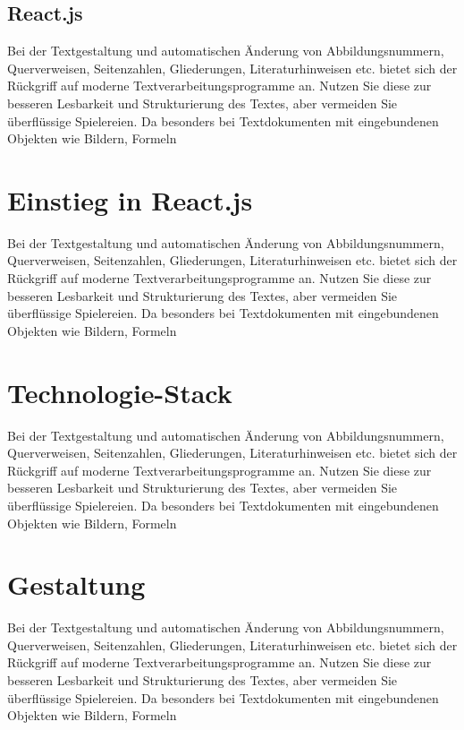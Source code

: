 \subsection{React.js}
Bei der Textgestaltung und automatischen Änderung von Abbildungsnummern, Querverweisen,
Seitenzahlen, Gliederungen, Literaturhinweisen etc. bietet sich der Rückgriff
auf moderne Textverarbeitungsprogramme an. Nutzen Sie diese zur besseren Lesbarkeit
und Strukturierung des Textes, aber vermeiden Sie überflüssige Spielereien. Da
besonders bei Textdokumenten mit eingebundenen Objekten wie Bildern, Formeln

\section{Einstieg in React.js}
Bei der Textgestaltung und automatischen Änderung von Abbildungsnummern, Querverweisen,
Seitenzahlen, Gliederungen, Literaturhinweisen etc. bietet sich der Rückgriff
auf moderne Textverarbeitungsprogramme an. Nutzen Sie diese zur besseren Lesbarkeit
und Strukturierung des Textes, aber vermeiden Sie überflüssige Spielereien. Da
besonders bei Textdokumenten mit eingebundenen Objekten wie Bildern, Formeln

\section{Technologie-Stack}
Bei der Textgestaltung und automatischen Änderung von Abbildungsnummern, Querverweisen,
Seitenzahlen, Gliederungen, Literaturhinweisen etc. bietet sich der Rückgriff
auf moderne Textverarbeitungsprogramme an. Nutzen Sie diese zur besseren Lesbarkeit
und Strukturierung des Textes, aber vermeiden Sie überflüssige Spielereien. Da
besonders bei Textdokumenten mit eingebundenen Objekten wie Bildern, Formeln

\section{Gestaltung}
Bei der Textgestaltung und automatischen Änderung von Abbildungsnummern, Querverweisen,
Seitenzahlen, Gliederungen, Literaturhinweisen etc. bietet sich der Rückgriff
auf moderne Textverarbeitungsprogramme an. Nutzen Sie diese zur besseren Lesbarkeit
und Strukturierung des Textes, aber vermeiden Sie überflüssige Spielereien. Da
besonders bei Textdokumenten mit eingebundenen Objekten wie Bildern, Formeln
